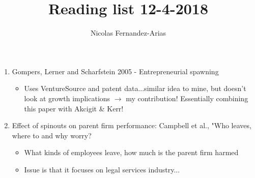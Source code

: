 \documentclass[12pt,english]{article}
\theoremstyle{remark}
\begin{document}
	
	\title{Reading list 12-4-2018}
	\author{Nicolas Fernandez-Arias}
	\maketitle
	
\begin{enumerate}
	\item Gompers, Lerner and Scharfstein 2005 - Entrepreneurial spawning
	\begin{itemize}
		\item Uses VentureSource and patent data...similar idea to mine, but doesn't look at growth implications $\rightarrow$ my contribution! Essentially combining this paper with Akcigit \& Kerr! 
	\end{itemize}
	\item Effect of spinouts on parent firm performance: Campbell et al., "Who leaves, where to and why worry?
	\begin{itemize}
		\item What kinds of employees leave, how much is the parent firm harmed
		\item Issue is that it focuses on legal services industry...
	\end{itemize}
\end{enumerate}
\end{document}
